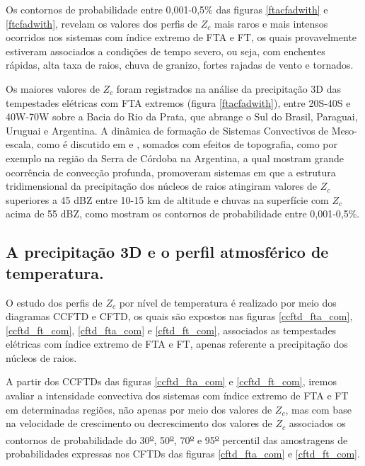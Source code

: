 Os contornos de probabilidade entre 0,001-0,5\% das figuras \ref{ftacfadwith} e \ref{ftcfadwith}, revelam os valores dos perfis de $Z_c$ mais raros e mais intensos ocorridos nos sistemas com índice extremo de FTA e FT, os quais provavelmente estiveram associados a condições de tempo severo, ou seja, com enchentes rápidas, alta taxa de raios, chuva de granizo, fortes rajadas de vento e tornados. 

Os maiores valores de $Z_c$ foram registrados na análise da precipitação 3D das tempestades elétricas com FTA extremos (figura \ref{ftacfadwith}), entre 20S-40S e 40W-70W sobre a Bacia do Rio da Prata, que abrange o Sul do Brasil, Paraguai, Uruguai e Argentina. A dinâmica de formação de Sistemas Convectivos de Meso-escala, como é discutido em \cite{Velasco1987} e \cite{Durkee2009}, somados com efeitos de topografia, como por exemplo na região da Serra de Córdoba na Argentina, a qual \cite{Rasmussen2011} mostram grande ocorrência de convecção profunda, promoveram sistemas em que a estrutura tridimensional da precipitação dos núcleos de raios atingiram valores de $Z_c$ superiores a 45 dBZ entre 10-15 km de altitude e chuvas na superfície com $Z_c$ acima de 55 dBZ, como mostram os contornos de probabilidade entre 0,001-0,5\%.


\subsection{A precipitação 3D e o perfil atmosférico de temperatura.}

O estudo dos perfis de $Z_c$ por nível de temperatura é realizado por meio dos diagramas CCFTD e CFTD, os quais são expostos nas figuras \ref{ccftd_fta_com}, \ref{ccftd_ft_com}, \ref{cftd_fta_com} e \ref{cftd_ft_com}, associados as tempestades elétricas com índice extremo de FTA e FT, apenas referente a precipitação dos núcleos de raios.

A partir dos CCFTDs das figuras \ref{ccftd_fta_com} e \ref{ccftd_ft_com}, iremos avaliar a intensidade convectiva dos sistemas com índice extremo de FTA e FT em determinadas regiões, não apenas por meio dos valores de $Z_c$, mas com base na velocidade de crescimento ou decrescimento dos valores de $Z_{c}$ associados os contornos de probabilidade do 30\textsuperscript{\underline{o}}, 50\textsuperscript{\underline{o}}, 70\textsuperscript{\underline{o}} e 95\textsuperscript{\underline{o}} percentil das amostragens de probabilidades expressas nos CFTDs das figuras \ref{cftd_fta_com} e \ref{cftd_ft_com}.	




